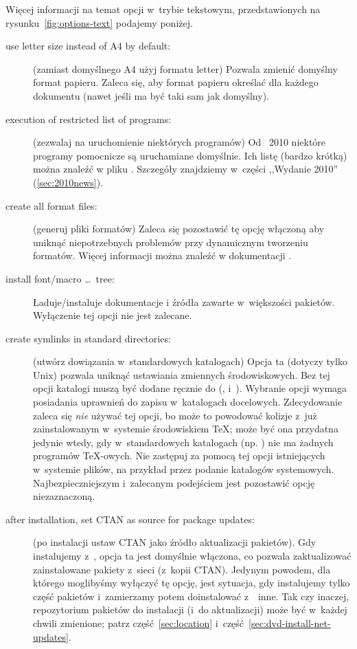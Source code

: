 \documentclass{article}
\begin{document}
Więcej informacji na temat opcji w~trybie tekstowym, przedstawionych na
rysunku~\ref{fig:options-text} podajemy poniżej.
\begin{description}
\item[use letter size instead of A4 by default:] (zamiast domyślnego A4 użyj  formatu
 letter) Pozwala zmienić domyślny format papieru. Zaleca się, aby format papieru
 określać  dla każdego dokumentu (nawet jeśli ma być taki sam jak domyślny).

\item[execution of restricted list of programs:] (zezwalaj na uruchomienie
 niektórych programów) Od \TL\ 2010 niektóre programy pomocnicze są uruchamiane domyślnie.
 Ich listę (bardzo krótką) można znaleźć w pliku  .
 Szczegóły znajdziemy w~części ,,Wydanie 2010'' (\ref{sec:2010news}).
\item[create all format files:] (generuj pliki formatów)
 Zaleca się pozostawić tę opcję włączoną 
  aby uniknąć niepotrzebnych problemów przy dynamicznym tworzeniu formatów. Więcej informacji można znaleźć w dokumentacji  .

\item[install font/macro \ldots\ tree:]  Ładuje/instaluje dokumentacje i źródła
 zawarte w~większości pakietów.  Wyłączenie tej opcji nie jest zalecane.

\item[create symlinks in standard directories:] (utwórz dowiązania
 w~standardowych katalogach) Opcja ta (dotyczy tylko Unix)  pozwala
 uniknąć ustawiania zmiennych środowiskowych. Bez tej opcji katalogi \TL{}
 muszą być dodane  ręcznie do (,  i~).
 Wybranie opcji wymaga posiadania uprawnień do zapisu w~katalogach docelowych.
 Zdecydowanie zaleca się  \emph{nie} używać tej opcji, bo może to powodować
 kolizje z~już zainstalowanym w~systemie środowiskiem \TeX; może być
 ona przydatna jedynie wtedy, gdy w~standardowych katalogach
 (np. ) nie ma żadnych programów
 \TeX-owych. Nie zastępuj za pomocą tej opcji istniejących w~systemie
 plików, na przykład przez podanie katalogów
 systemowych. Najbezpieczniejszym i~zalecanym podejściem jest
 pozostawić opcję niezaznaczoną.

\item[after installation, set CTAN as source for package updates:] (po instalacji
 ustaw CTAN jako źródło aktualizacji pakietów).   Gdy instalujemy z~\DVD, opcja ta
 jest domyślnie włączona, co pozwala zaktualizować zainstalowane pakiety z~sieci (z~kopii
 CTAN). Jedynym powodem, dla którego moglibyśmy wyłączyć tę opcję, jest sytuacja,
 gdy instalujemy tylko część pakietów i~zamierzamy potem doinstalować z~\DVD\
 inne. Tak czy inaczej, repozytorium pakietów do instalacji (i~do aktualizacji)
 może być w~każdej chwili zmienione; patrz część~\ref{sec:location}
 i~część~\ref{sec:dvd-install-net-updates}.

\end{description}
\end{document}
